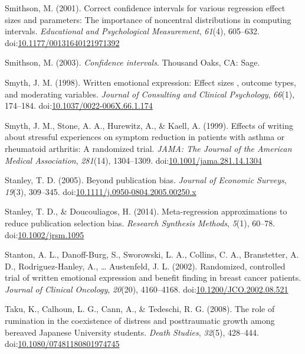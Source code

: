 \documentclass[man, mask]{apa6}
\theoremstyle{definition}
\theoremstyle{definition}
\theoremstyle{definition}
\theoremstyle{remark}
\begin{document}
\hypertarget{ref-Smithson2001}{}
Smithson, M. (2001). Correct confidence intervals for various regression
effect sizes and parameters: The importance of noncentral distributions
in computing intervals. \emph{Educational and Psychological
Measurement}, \emph{61}(4), 605--632.
doi:\href{https://doi.org/10.1177/00131640121971392}{10.1177/00131640121971392}

\hypertarget{ref-Smithson2003}{}
Smithson, M. (2003). \emph{Confidence intervals}. Thousand Oaks, CA:
Sage.

\hypertarget{ref-Smyth1998}{}
Smyth, J. M. (1998). Written emotional expression: Effect sizes ,
outcome types, and moderating variables. \emph{Journal of Consulting and
Clinical Psychology}, \emph{66}(1), 174--184.
doi:\href{https://doi.org/10.1037/0022-006X.66.1.174}{10.1037/0022-006X.66.1.174}

\hypertarget{ref-Smyth1999}{}
Smyth, J. M., Stone, A. A., Hurewitz, A., \& Kaell, A. (1999). Effects
of writing about stressful experiences on symptom reduction in patients
with asthma or rheumatoid arthritis: A randomized trial. \emph{JAMA: The
Journal of the American Medical Association}, \emph{281}(14),
1304--1309.
doi:\href{https://doi.org/10.1001/jama.281.14.1304}{10.1001/jama.281.14.1304}

\hypertarget{ref-Stanley2005}{}
Stanley, T. D. (2005). Beyond publication bias. \emph{Journal of
Economic Surveys}, \emph{19}(3), 309--345.
doi:\href{https://doi.org/10.1111/j.0950-0804.2005.00250.x}{10.1111/j.0950-0804.2005.00250.x}

\hypertarget{ref-Stanley2014}{}
Stanley, T. D., \& Doucouliagos, H. (2014). Meta-regression
approximations to reduce publication selection bias. \emph{Research
Synthesis Methods}, \emph{5}(1), 60--78.
doi:\href{https://doi.org/10.1002/jrsm.1095}{10.1002/jrsm.1095}

\hypertarget{ref-Stanton2002}{}
Stanton, A. L., Danoff-Burg, S., Sworowski, L. A., Collins, C. A.,
Branstetter, A. D., Rodriguez-Hanley, A., \ldots{} Austenfeld, J. L.
(2002). Randomized, controlled trial of written emotional expression and
benefit finding in breast cancer patients. \emph{Journal of Clinical
Oncology}, \emph{20}(20), 4160--4168.
doi:\href{https://doi.org/10.1200/JCO.2002.08.521}{10.1200/JCO.2002.08.521}

\hypertarget{ref-Taku2008}{}
Taku, K., Calhoun, L. G., Cann, A., \& Tedeschi, R. G. (2008). The role
of rumination in the coexistence of distress and posttraumatic growth
among bereaved Japanese University students. \emph{Death Studies},
\emph{32}(5), 428--444.
doi:\href{https://doi.org/10.1080/07481180801974745}{10.1080/07481180801974745}
\end{document}
